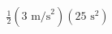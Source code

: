 \documentclass[preview]{standalone}
\begin{document}
\begin{align*}
\frac{1}{2} (3 \text{ m/s}^2)(25 \text{ s}^2)
\end{align*}
\end{document}
